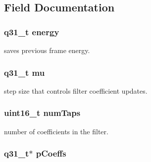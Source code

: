 \subsection{Field Documentation}
\hypertarget{structarm__lms__norm__instance__q31_a012fee0f71095d2557bb633e73ef7355}{
\subsubsection[{energy}]{\setlength{\rightskip}{0pt plus 5cm}q31\-\_\-t energy}}\label{structarm__lms__norm__instance__q31_a012fee0f71095d2557bb633e73ef7355}
saves previous frame energy. \hypertarget{structarm__lms__norm__instance__q31_a21ab4237a726ea7751f5026d89d2e577}{
\subsubsection[{mu}]{\setlength{\rightskip}{0pt plus 5cm}q31\-\_\-t mu}}\label{structarm__lms__norm__instance__q31_a21ab4237a726ea7751f5026d89d2e577}
step size that controls filter coefficient updates. \hypertarget{structarm__lms__norm__instance__q31_a751941891e47f522a7f5375fe8990aac}{
\subsubsection[{num\-Taps}]{\setlength{\rightskip}{0pt plus 5cm}uint16\-\_\-t num\-Taps}}\label{structarm__lms__norm__instance__q31_a751941891e47f522a7f5375fe8990aac}
number of coefficients in the filter. \hypertarget{structarm__lms__norm__instance__q31_a68888e36167d81cb7836db10367a1682}{
\subsubsection[{p\-Coeffs}]{\setlength{\rightskip}{0pt plus 5cm}q31\-\_\-t$\ast$ p\-Coeffs}}\label{structarm__lms__norm__instance__q31_a68888e36167d81cb7836db10367a1682}
